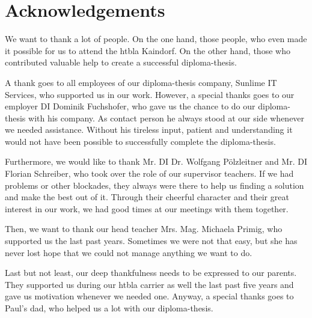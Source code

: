 \chapter*{Acknowledgements}
We want to thank a lot of people. On the one hand, those people, who even made it possible for us to attend the \gls{htbla} Kaindorf. On the other hand, those who contributed valuable help to create a successful diploma-thesis.

A thank goes to all employees of our diploma-thesis company, Sunlime IT Services, who supported us in our work. However, a special thanks goes to our employer DI Dominik Fuchshofer, who gave us the chance to do our diploma-thesis with his company. As contact person he always stood at our side whenever we needed assistance. Without his tireless input, patient and understanding it would not have been possible to successfully complete the diploma-thesis.

Furthermore, we would like to thank Mr. DI Dr. Wolfgang Pölzleitner and Mr. DI Florian Schreiber, who took over the role of our supervisor teachers. If we had problems or other blockades, they always were there to help us finding a solution and make the best out of it. Through their cheerful character and their great interest in our work, we had good times at our meetings with them together.

Then, we want to thank our head teacher Mrs. Mag. Michaela Primig, who supported us the last past years. Sometimes we were not that easy, but she has never lost hope that we could not manage anything we want to do.

Last but not least, our deep thankfulness needs to be expressed to our parents. They supported us during our \gls{htbla} carrier as well the last past five years and gave us motivation whenever we needed one. Anyway, a special thanks goes to Paul’s dad, who helped us a lot with our diploma-thesis.
